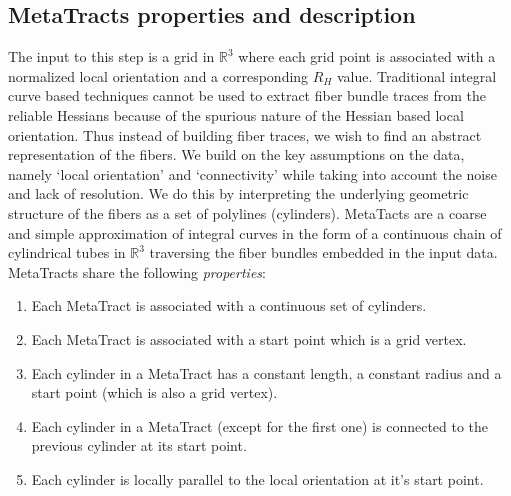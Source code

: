 \subsection {MetaTracts properties and description} 
\label{subsec:mtprop}
The input to this step is a grid in $\mathbb{R}^3$ where each grid point is associated with a normalized local orientation and a corresponding $R_H$ value.
Traditional integral curve based techniques cannot be used to extract fiber bundle traces from the reliable Hessians because of the spurious nature of the Hessian based local orientation. Thus instead of building fiber traces, we wish to find an abstract representation of the fibers. We build on the key assumptions on the data, namely `local orientation' and `connectivity' while taking into account the noise and lack of resolution. We do this by interpreting the underlying geometric structure of the fibers as a set of polylines (cylinders). MetaTacts  are a coarse and simple approximation of integral curves in the form of a continuous chain of cylindrical tubes in $\mathbb{R}^3$ traversing the fiber bundles embedded in the input data. MetaTracts share the following \textit{properties}:

\begin{enumerate}
\item{Each MetaTract is associated with a continuous set of cylinders.}
\item{Each MetaTract is associated with a start point which is a grid vertex.}
\item{Each cylinder in a MetaTract has a constant length, a constant radius and a start point (which is also a grid vertex).}
\item{Each cylinder in a MetaTract (except for the first one) is connected to the previous cylinder at its start point.}
\item{Each cylinder is locally parallel to the local orientation at it's start point.}
\end{enumerate}


